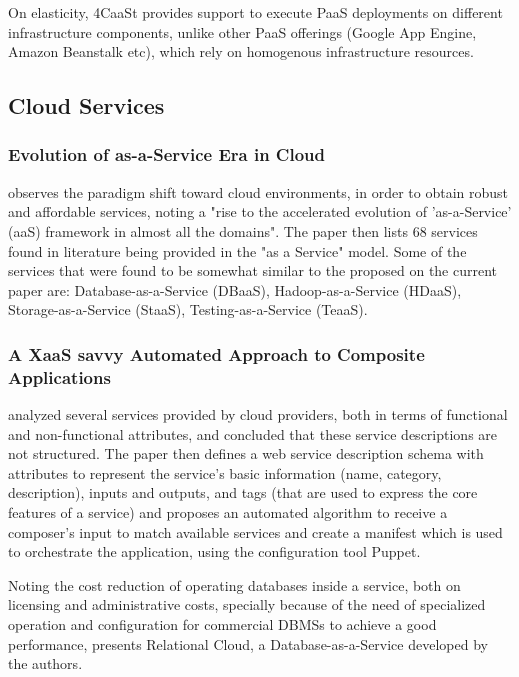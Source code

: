 On elasticity, 4CaaSt provides support to execute PaaS deployments on different infrastructure components, unlike other PaaS offerings (Google App Engine, Amazon Beanstalk etc), which rely on homogenous infrastructure resources.

\subsection{Cloud Services}

\subsubsection{Evolution of as-a-Service Era in Cloud}

 observes the paradigm shift toward cloud environments, in order to obtain robust and affordable services, noting a "rise to the accelerated evolution of 'as-a-Service' (aaS) framework in almost all the domains". The paper then lists 68 services found in literature being provided in the "as a Service" model. Some of the services that were found to be somewhat similar to the proposed on the current paper are: Database-as-a-Service (DBaaS), Hadoop-as-a-Service (HDaaS), Storage-as-a-Service (StaaS), Testing-as-a-Service (TeaaS).

\subsubsection{A XaaS savvy Automated Approach to Composite Applications}

 analyzed several services provided by cloud providers, both in terms of functional and non-functional attributes, and concluded that these service descriptions are not structured. The paper then defines a web service description schema with attributes to represent the service's basic information (name, category, description), inputs and outputs, and tags (that are used to express the core features of a service) and proposes an automated algorithm to receive a composer's input to match available services and create a manifest which is used to orchestrate the application, using the configuration tool Puppet.

Noting the cost reduction of operating databases inside a service, both on licensing and administrative costs, specially because of the need of specialized operation and configuration for commercial DBMSs to achieve a good performance,  presents Relational Cloud, a Database-as-a-Service developed by the authors.

